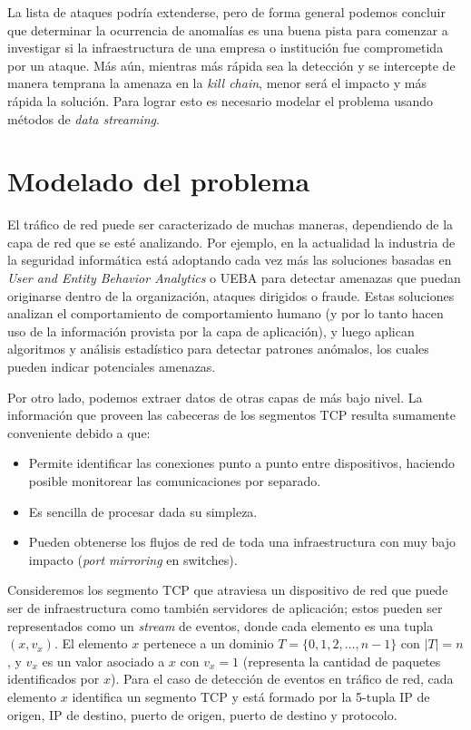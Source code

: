\documentclass[a4paper,10pt, oneside]{article}
\begin{document}
La lista de ataques podría extenderse, pero de forma general podemos concluir que determinar la ocurrencia de anomalías es una buena pista para comenzar a investigar si la infraestructura de una empresa o institución fue comprometida por un ataque. Más aún, mientras más rápida sea la detección y se intercepte de manera temprana la amenaza en la \textit{kill chain}, menor será el impacto y más rápida la solución. Para lograr esto es necesario modelar el problema usando métodos de \textit{data streaming}.

\newpage 

\section{Modelado del problema}\label{sec:modelado_del_problema}
El tráfico de red puede ser caracterizado de muchas maneras, dependiendo de la capa de red que se esté analizando. Por ejemplo, en la actualidad la industria de la seguridad informática está adoptando cada vez más las soluciones basadas en \textit{User and Entity Behavior Analytics} o UEBA para detectar amenazas que puedan originarse dentro de la organización, ataques dirigidos o fraude. Estas soluciones analizan el comportamiento de comportamiento humano (y por lo tanto hacen uso de la información provista por la capa de aplicación), y luego aplican algoritmos y análisis estadístico para detectar patrones anómalos, los cuales pueden indicar potenciales amenazas.

Por otro lado, podemos extraer datos de otras capas de más bajo nivel. La información que proveen las cabeceras de los segmentos TCP resulta sumamente conveniente debido a que:
\begin{itemize}
	\item Permite identificar las conexiones punto a punto entre dispositivos, haciendo posible monitorear las comunicaciones por separado.
	\item Es sencilla de procesar dada su simpleza.
	\item Pueden obtenerse los flujos de red de toda una infraestructura con muy bajo impacto (\textit{port mirroring} en switches).
\end{itemize}

Consideremos los segmento TCP que atraviesa un dispositivo de red que puede ser de infraestructura como también servidores de aplicación; estos pueden ser representados como un \textit{stream} de eventos, donde cada elemento es una tupla $(x, v_x)$. El elemento $x$ pertenece a un dominio $T=\{0,1,2, \dots, n-1\}$ con $|T|=n$, y $v_x$ es un valor asociado a $x$ con $v_x=1$ (representa la cantidad de paquetes identificados por $x$). Para el caso de detección de eventos en tráfico de red, cada elemento $x$ identifica un segmento TCP y está formado por la 5-tupla IP de origen, IP de destino, puerto de origen, puerto de destino y protocolo. 
\end{document}
